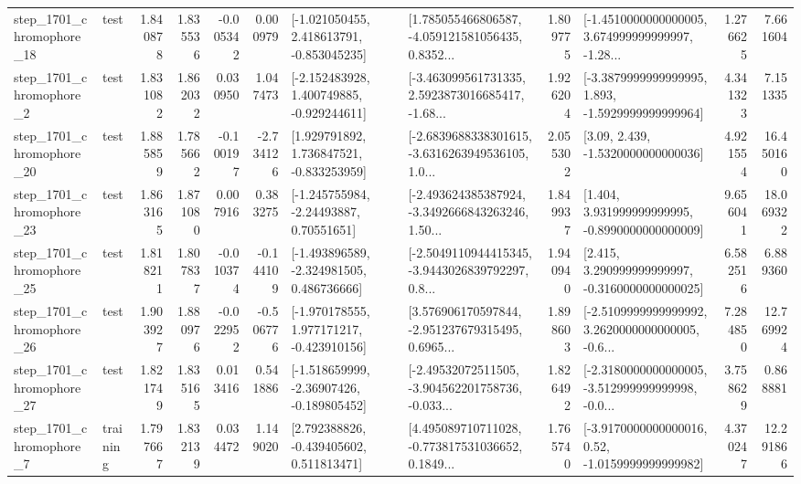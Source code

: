\begin{tabular}{llrrrrllrlrr}
 step\_1701\_chromophore\_18 &      test &      1.840878 &    1.835536 &     -0.005342 &  0.000979 &   [-1.021050455, 2.418613791, -0.853045235] &  [1.785055466806587, -4.059121581056435, 0.8352... &       1.809775 &  [-1.4510000000000005, 3.674999999999997, -1.28... &            1.276625 &          7.661604 \\
  step\_1701\_chromophore\_2 &      test &      1.831082 &    1.862032 &      0.030950 &  1.047473 &   [-2.152483928, 1.400749885, -0.929244611] &  [-3.463099561731335, 2.5923873016685417, -1.68... &       1.926204 &  [-3.3879999999999995, 1.893, -1.5929999999999964] &            4.341323 &          7.151335 \\
 step\_1701\_chromophore\_20 &      test &      1.885859 &    1.785662 &     -0.100197 & -2.734126 &    [1.929791892, 1.736847521, -0.833253959] &  [-2.6839688338301615, -3.6316263949536105, 1.0... &       2.055302 &                 [3.09, 2.439, -1.5320000000000036] &            4.921554 &         16.450160 \\
 step\_1701\_chromophore\_23 &      test &      1.863165 &    1.871080 &      0.007916 &  0.383275 &     [-1.245755984, -2.24493887, 0.70551651] &  [-2.493624385387924, -3.3492666843263246, 1.50... &       1.849937 &    [1.404, 3.931999999999995, -0.8990000000000009] &            9.656041 &         18.069322 \\
 step\_1701\_chromophore\_25 &      test &      1.818211 &    1.807837 &     -0.010374 & -0.144109 &   [-1.493896589, -2.324981505, 0.486736666] &  [-2.5049110944415345, -3.9443026839792297, 0.8... &       1.940940 &    [2.415, 3.290999999999997, -0.3160000000000025] &            6.582516 &          6.889360 \\
 step\_1701\_chromophore\_26 &      test &      1.903927 &    1.880976 &     -0.022952 & -0.506776 &   [-1.970178555, 1.977171217, -0.423910156] &  [3.576906170597844, -2.951237679315495, 0.6965... &       1.898603 &  [-2.5109999999999992, 3.2620000000000005, -0.6... &            7.284850 &         12.769924 \\
 step\_1701\_chromophore\_27 &      test &      1.821749 &    1.835165 &      0.013416 &  0.541886 &   [-1.518659999, -2.36907426, -0.189805452] &  [-2.49532072511505, -3.904562201758736, -0.033... &       1.826492 &  [-2.3180000000000005, -3.512999999999998, -0.0... &            3.758629 &          0.868881 \\
  step\_1701\_chromophore\_7 &  training &      1.797667 &    1.832139 &      0.034472 &  1.149020 &    [2.792388826, -0.439405602, 0.511813471] &  [4.495089710711028, -0.773817531036652, 0.1849... &       1.765740 &   [-3.9170000000000016, 0.52, -1.0159999999999982] &            4.370247 &         12.291866 \\

\end{tabular}
